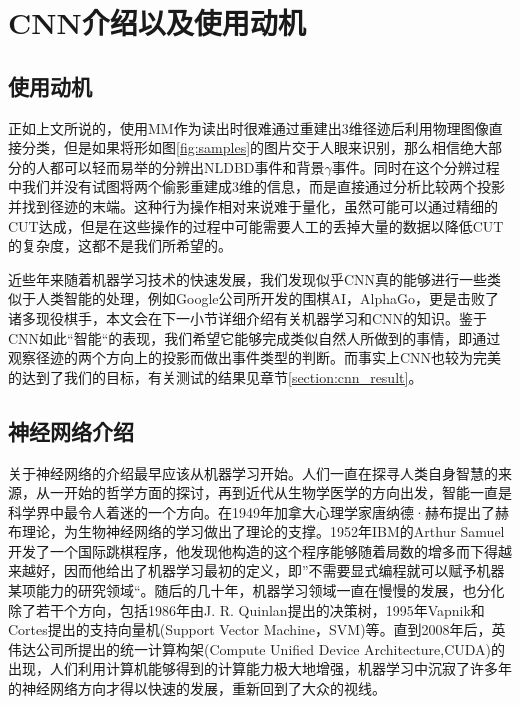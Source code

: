 \section{CNN介绍以及使用动机}

\subsection{使用动机}
正如上文所说的，使用MM作为读出时很难通过重建出3维径迹后利用物理图像直接分类，但是如果将形如图\ref{fig:samples}的图片交于人眼来识别，那么相信绝大部分的人都可以轻而易举的分辨出NLDBD事件和背景$\gamma$事件。同时在这个分辨过程中我们并没有试图将两个偷影重建成3维的信息，而是直接通过分析比较两个投影并找到径迹的末端。这种行为操作相对来说难于量化，虽然可能可以通过精细的CUT达成，但是在这些操作的过程中可能需要人工的丢掉大量的数据以降低CUT的复杂度，这都不是我们所希望的。

近些年来随着机器学习技术的快速发展，我们发现似乎CNN真的能够进行一些类似于人类智能的处理，例如Google公司所开发的围棋AI，AlphaGo\supercite{gibney2016google}，更是击败了诸多现役棋手，本文会在下一小节详细介绍有关机器学习和CNN的知识。鉴于CNN如此“智能“的表现，我们希望它能够完成类似自然人所做到的事情，即通过观察径迹的两个方向上的投影而做出事件类型的判断。而事实上CNN也较为完美的达到了我们的目标，有关测试的结果见章节\ref{section:cnn_result}。

\subsection{神经网络介绍}

关于神经网络的介绍最早应该从机器学习开始。人们一直在探寻人类自身智慧的来源，从一开始的哲学方面的探讨，再到近代从生物学医学的方向出发，智能一直是科学界中最令人着迷的一个方向。在1949年加拿大心理学家唐纳德·赫布提出了赫布理论\supercite{hebbian}，为生物神经网络的学习做出了理论的支撑。1952年IBM的Arthur Samuel开发了一个国际跳棋程序，他发现他构造的这个程序能够随着局数的增多而下得越来越好，因而他给出了机器学习最初的定义，即”不需要显式编程就可以赋予机器某项能力的研究领域“。随后的几十年，机器学习领域一直在慢慢的发展，也分化除了若干个方向，包括1986年由J. R. Quinlan提出的决策树，1995年Vapnik和Cortes提出的支持向量机(Support Vector Machine，SVM)等\supercite{mlhistory}。直到2008年后，英伟达公司所提出的统一计算构架(Compute Unified Device Architecture,CUDA)\supercite{CUDA}的出现，人们利用计算机能够得到的计算能力极大地增强，机器学习中沉寂了许多年的神经网络方向才得以快速的发展，重新回到了大众的视线。

